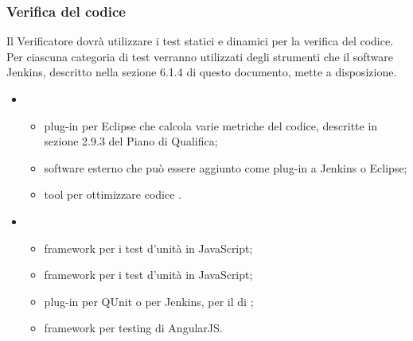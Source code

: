 \subsubsection{Verifica del codice}
Il Verificatore dovrà utilizzare i test statici e dinamici per la verifica del codice. Per ciascuna categoria di test verranno utilizzati degli strumenti che il software Jenkins, descritto nella sezione 6.1.4 di questo documento, mette a disposizione.
\begin{itemize}
\item {}
\begin{itemize}
\item {}plug-in per Eclipse che calcola varie metriche del codice, descritte in sezione 2.9.3 del Piano di Qualifica;
\item {}software esterno che può essere aggiunto come plug-in a Jenkins o Eclipse;
\item {}tool per ottimizzare codice .
\end{itemize}
\item {}
\begin{itemize}
\item {}framework per i test d'unità in JavaScript;
\item {}framework per i test d'unità in JavaScript;
\item {}plug-in per QUnit o per Jenkins, per il  di ;
\item {}framework per testing di AngularJS.
\end{itemize}
\end{itemize}

